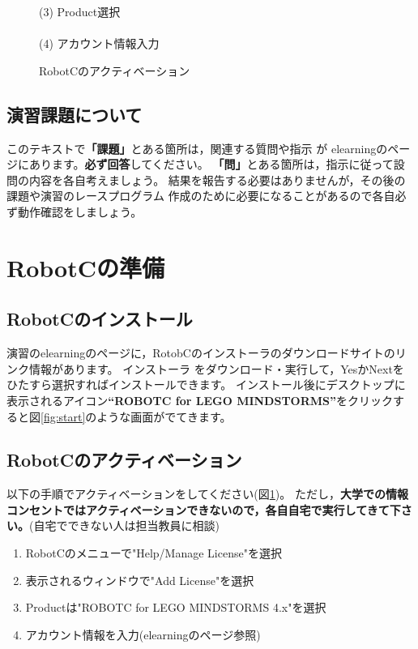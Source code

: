 \documentclass[11pt]{jsarticle}
\begin{document}
\begin{figure}
{(3) Product選択\\
   \\
(4) アカウント情報入力\\
}
\caption{\label{fig:activation}RobotCのアクティベーション}
\end{figure}
\subsection{演習課題について}
このテキストで\textbf{「課題」}とある箇所は，関連する質問や指示
が elearningのページにあります。\textbf{必ず回答}してください。
\textbf{「問」}とある箇所は，指示に従って設問の内容を各自考えましょう。
結果を報告する必要はありませんが，その後の課題や演習のレースプログラム
作成のために必要になることがあるので各自必ず動作確認をしましょう。

\section{RobotCの準備}
\subsection{RobotCのインストール}

演習のelearningのページに，RotobCのインストーラのダウンロードサイトのリンク情報があります。
インストーラ%
をダウンロード・実行して，YesかNextをひたすら選択すればインストールできます。
インストール後にデスクトップに表示されるアイコン\textbf{``ROBOTC for LEGO MINDSTORMS''}をクリックすると図\ref{fig:start}のような画面がでてきます。

\subsection{RobotCのアクティベーション}
以下の手順でアクティベーションをしてください(図\ref{fig:activation})。
ただし，\textbf{大学での情報コンセントではアクティベーションできないので，各自自宅で実行してきて下さい。}(自宅でできない人は担当教員に相談)
\begin{enumerate}
	\item RobotCのメニューで"Help/Manage License"を選択
	\item 表示されるウィンドウで"Add License"を選択
	\item Productは"ROBOTC for LEGO MINDSTORMS 4.x"を選択
	\item アカウント情報を入力(elearningのページ参照)
\end{enumerate}
\end{document}
